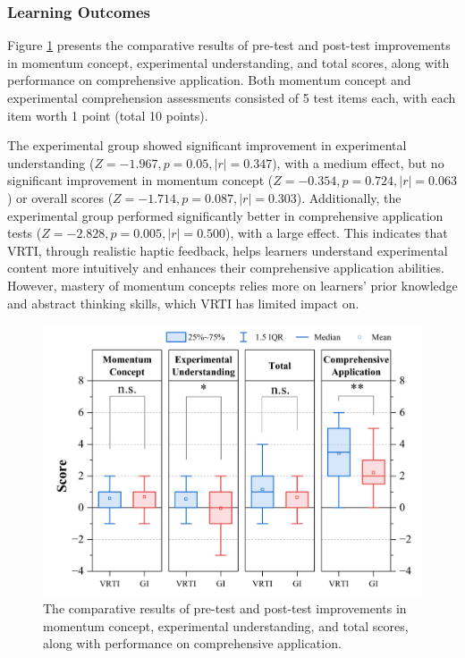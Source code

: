 \documentclass[sigconf,review,anonymous]{acmart}
\begin{document}
\subsubsection{Learning Outcomes}
Figure \ref{fig:improvements-result} presents the comparative results of pre-test and post-test improvements in momentum concept, experimental understanding, and total scores, along with performance on comprehensive application. Both momentum concept and experimental comprehension assessments consisted of 5 test items each, with each item worth 1 point (total 10 points).

The experimental group showed significant improvement in experimental understanding ($Z=-1.967, p=0.05, |r|=0.347$), with a medium effect, but no significant improvement in momentum concept ($Z=-0.354, p=0.724, |r|=0.063$) or overall scores ($Z=-1.714, p=0.087, |r|=0.303$). Additionally, the experimental group performed significantly better in comprehensive application tests ($Z=-2.828, p=0.005, |r|=0.500$), with a large effect. This indicates that VRTI, through realistic haptic feedback, helps learners understand experimental content more intuitively and enhances their comprehensive application abilities. However, mastery of momentum concepts relies more on learners' prior knowledge and abstract thinking skills, which VRTI has limited impact on.

\begin{figure}[h]
  \centering
  \includegraphics[width=\linewidth]{image/improvements-result.pdf}
  \caption{The comparative results of pre-test and post-test improvements in momentum concept, experimental understanding, and total scores, along with performance on comprehensive application.}
  \label{fig:improvements-result}
\end{figure}
\end{document}
